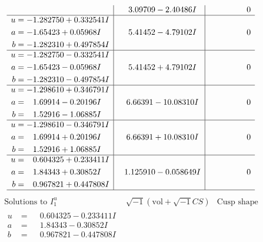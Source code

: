 \documentclass[1p]{elsarticle_modified}
\theoremstyle{definition}
\newcommand{\I}{\sqrt{-1}}
\begin{document}
$$\begin{array}{c|c|c}
 & \phantom{-}3.09709 - 2.40486 I & \phantom{-0.000000 } 0 \\ \hline\begin{aligned}
u &= -1.282750 + 0.332541 I \\
a &= -1.65423 + 0.05968 I \\
b &= -1.282310 + 0.497854 I\end{aligned}
 & \phantom{-}5.41452 - 4.79102 I & \phantom{-0.000000 } 0 \\ \hline\begin{aligned}
u &= -1.282750 - 0.332541 I \\
a &= -1.65423 - 0.05968 I \\
b &= -1.282310 - 0.497854 I\end{aligned}
 & \phantom{-}5.41452 + 4.79102 I & \phantom{-0.000000 } 0 \\ \hline\begin{aligned}
u &= -1.298610 + 0.346791 I \\
a &= \phantom{-}1.69914 - 0.20196 I \\
b &= \phantom{-}1.52916 - 1.06885 I\end{aligned}
 & \phantom{-}6.66391 - 10.08310 I & \phantom{-0.000000 } 0 \\ \hline\begin{aligned}
u &= -1.298610 - 0.346791 I \\
a &= \phantom{-}1.69914 + 0.20196 I \\
b &= \phantom{-}1.52916 + 1.06885 I\end{aligned}
 & \phantom{-}6.66391 + 10.08310 I & \phantom{-0.000000 } 0 \\ \hline\begin{aligned}
u &= \phantom{-}0.604325 + 0.233411 I \\
a &= \phantom{-}1.84343 + 0.30852 I \\
b &= \phantom{-}0.967821 + 0.447808 I\end{aligned}
 & \phantom{-}1.125910 - 0.058649 I & \phantom{-0.000000 } 0\\
 \hline 
 \end{array}$$\newpage$$\begin{array}{c|c|c}  
\text{Solutions to }I^u_{1}& \I (\text{vol} + \sqrt{-1}CS) & \text{Cusp shape}\\
 \hline 
\begin{aligned}
u &= \phantom{-}0.604325 - 0.233411 I \\
a &= \phantom{-}1.84343 - 0.30852 I \\
b &= \phantom{-}0.967821 - 0.447808 I\end{aligned}

\end{array}$$
\end{document}
